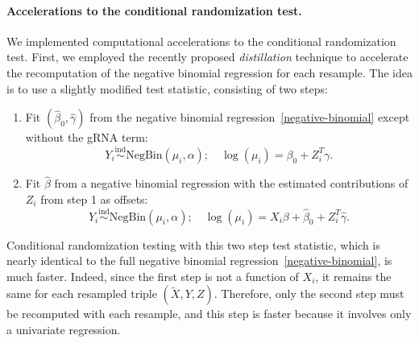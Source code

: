 \documentclass{article}
\begin{document}
\paragraph{Accelerations to the conditional randomization test.}
We implemented computational accelerations to the conditional randomization test. First, we employed the recently proposed\cite{Liu2020} \textit{distillation} technique to accelerate the recomputation of the negative binomial regression for each resample. The idea is to use a slightly modified test statistic, consisting of two steps:
\begin{enumerate}
	\item Fit $(\widehat \beta_0, \widehat \gamma)$ from the negative binomial regression~\eqref{negative-binomial} except without the gRNA term:
	\begin{equation}
	Y_i \overset{\text{ind}}\sim \textrm{NegBin}(\mu_i, \alpha); \quad \log(\mu_i) = \beta_0 + Z_i^T \gamma.
	\label{negative-binomial-distillation}
	\end{equation}
	\item Fit $\widehat \beta$ from a negative binomial regression with the estimated contributions of $Z_i$ from step 1 as offsets:
	\begin{equation}
	Y_i \overset{\text{ind}}\sim \textrm{NegBin}(\mu_i, \alpha); \quad \log(\mu_i) = X_i \beta + \widehat \beta_0 + Z_i^T \widehat \gamma.
	\label{distilled-negative-binomial}
	\end{equation}
\end{enumerate}
Conditional randomization testing with this two step test statistic, which is nearly identical to the full negative binomial regression~\eqref{negative-binomial}, is much faster. Indeed, since the first step is not a function of $X_i$, it remains the same for each resampled triple $(\widetilde X, Y, Z)$. Therefore, only the second step must be recomputed with each resample, and this step is faster because it involves only a univariate regression.
\end{document}
